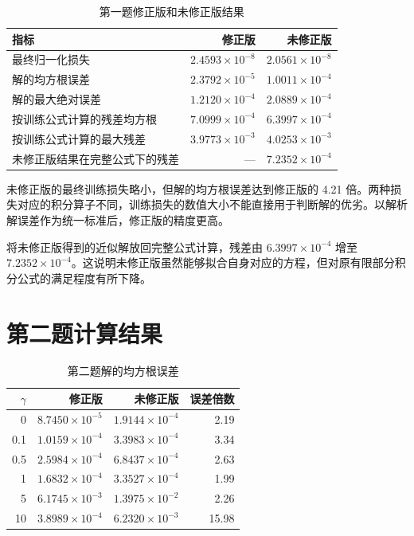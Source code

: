 \documentclass[UTF8,fontset=none,11pt,a4paper]{ctexart}
\begin{document}
\begin{table}[H]
\centering
\caption{第一题修正版和未修正版结果}
\begin{tabular}{lrr}
\toprule
指标 & 修正版 & 未修正版\\
\midrule
最终归一化损失 & $2.4593\times10^{-8}$ & $2.0561\times10^{-8}$\\
解的均方根误差 & $2.3792\times10^{-5}$ & $1.0011\times10^{-4}$\\
解的最大绝对误差 & $1.2120\times10^{-4}$ & $2.0889\times10^{-4}$\\
按训练公式计算的残差均方根 & $7.0999\times10^{-4}$ & $6.3997\times10^{-4}$\\
按训练公式计算的最大残差 & $3.9773\times10^{-3}$ & $4.0253\times10^{-3}$\\
未修正版结果在完整公式下的残差 & --- & $7.2352\times10^{-4}$\\
\bottomrule
\end{tabular}
\end{table}

未修正版的最终训练损失略小，但解的均方根误差达到修正版的 4.21 倍。两种损失对应的积分算子不同，训练损失的数值大小不能直接用于判断解的优劣。以解析解误差作为统一标准后，修正版的精度更高。

将未修正版得到的近似解放回完整公式计算，残差由 $6.3997\times10^{-4}$ 增至 $7.2352\times10^{-4}$。这说明未修正版虽然能够拟合自身对应的方程，但对原有限部分积分公式的满足程度有所下降。

\section{第二题计算结果}

\begin{table}[H]
\centering
\caption{第二题解的均方根误差}
\begin{tabular}{rrrr}
\toprule
$\gamma$ & 修正版 & 未修正版 & 误差倍数\\
\midrule
0 & $8.7450\times10^{-5}$ & $1.9144\times10^{-4}$ & 2.19\\
0.1 & $1.0159\times10^{-4}$ & $3.3983\times10^{-4}$ & 3.34\\
0.5 & $2.5984\times10^{-4}$ & $6.8437\times10^{-4}$ & 2.63\\
1 & $1.6832\times10^{-4}$ & $3.3527\times10^{-4}$ & 1.99\\
5 & $6.1745\times10^{-3}$ & $1.3975\times10^{-2}$ & 2.26\\
10 & $3.8989\times10^{-4}$ & $6.2320\times10^{-3}$ & 15.98\\
\bottomrule
\end{tabular}
\end{table}
\end{document}
